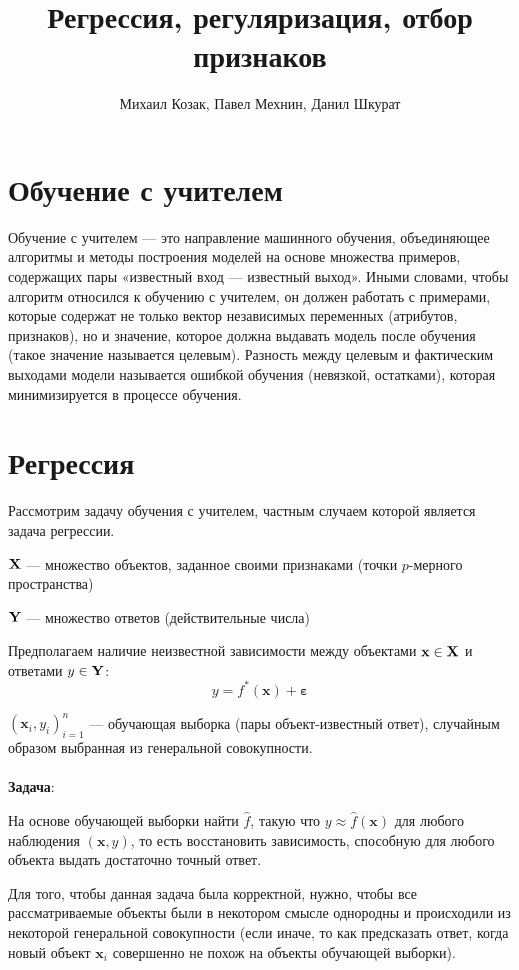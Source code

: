 \documentclass[12pt,a4paper,final]{article}
\author{Михаил Козак, Павел Мехнин, Данил Шкурат}
\title{Регрессия, регуляризация, отбор признаков}
\newcommand{\epss}{\bm{\varepsilon}}
\newcommand{\1}{\mathds{1}}
\begin{document}
\maketitle

\newpage

\section{Обучение с учителем}

Обучение с учителем — это направление машинного обучения, объединяющее алгоритмы и методы построения моделей на основе множества примеров, содержащих пары «известный вход — известный выход». Иными словами, чтобы алгоритм относился к обучению с учителем, он должен работать с примерами, которые содержат не только вектор независимых переменных (атрибутов, признаков), но и значение, которое должна выдавать модель после обучения (такое значение называется целевым). Разность между целевым и фактическим выходами модели называется ошибкой обучения (невязкой, остатками), которая минимизируется в процессе обучения.


\section{Регрессия}

Рассмотрим задачу обучения с учителем, частным случаем которой является задача регрессии.

$\bf X$ --- множество объектов, заданное своими признаками (точки $p$-мерного пространства)
	
$\bf Y$ --- множество ответов (действительные числа) 
	
Предполагаем наличие неизвестной зависимости между объектами $\mathbf x \in \bf X$ и ответами $y \in \bf Y$: $$y = f^*(\mathbf x) + \epss$$
	
$(\mathbf x_i,y_{i})_{i=1}^{n}$ --- обучающая выборка (пары объект-известный ответ), случайным образом выбранная из генеральной совокупности.
\\
\\	
\textbf{Задача}:

На основе обучающей выборки найти $\hat f$, такую что $y \approx 
\hat f(\mathbf x)$ для любого наблюдения $(\mathbf x, y)$, то есть восстановить зависимость, способную для любого объекта выдать достаточно точный ответ.

Для того, чтобы данная задача была корректной, нужно, чтобы все рассматриваемые объекты были в некотором смысле однородны и происходили из некоторой генеральной совокупности (если иначе, то как предсказать ответ, когда новый объект $\mathbf x_i$ совершенно не похож на объекты обучающей выборки).
\end{document}
